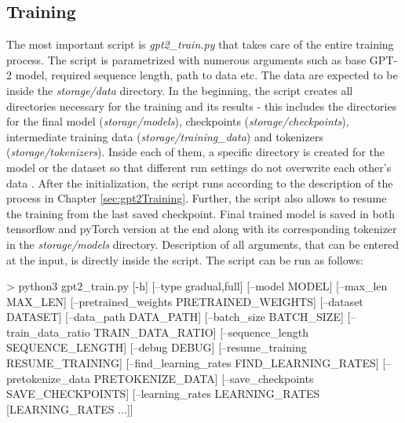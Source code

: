 \subsection*{Training}
The most important script is \textit{gpt2\_train.py} that takes care of the entire training process. The script is parametrized with numerous arguments such as base GPT-2 model, required sequence length, path to data etc. The data are expected to be inside the \textit{storage/data} directory. In the beginning, the script creates all directories necessary for the training and its results - this includes the directories for the final model (\textit{storage/models}), checkpoints (\textit{storage/checkpoints}), intermediate training data (\textit{storage/training\_data}) and tokenizers (\textit{storage/tokenizers}). Inside each of them, a specific directory is created for the model or the dataset so that different run settings do not overwrite each other's data . After the initialization, the script runs according to the description of the process in Chapter \ref{sec:gpt2Training}. Further, the script also allows to resume the training from the last saved checkpoint. Final trained model is saved in both tensorflow and pyTorch version at the end along with its corresponding tokenizer in the \textit{storage/models} directory. Description of all arguments, that can be entered at the input, is directly inside the script. The script can be run as follows:
\newpage
\begin{code}
> python3 gpt2_train.py [-h] [--type {gradual,full}] 
                [--model MODEL] [--max_len MAX_LEN] 
                [--pretrained_weights PRETRAINED_WEIGHTS] 
                [--dataset DATASET] [--data_path DATA_PATH] 
                [--batch_size BATCH_SIZE]
                [--train_data_ratio TRAIN_DATA_RATIO] 
                [--sequence_length SEQUENCE_LENGTH] [--debug DEBUG] 
                [--resume_training RESUME_TRAINING] 
                [--find_learning_rates FIND_LEARNING_RATES]
                [--pretokenize_data PRETOKENIZE_DATA] 
                [--save_checkpoints SAVE_CHECKPOINTS] 
                [--learning_rates LEARNING_RATES [LEARNING_RATES ...]]
\end{code}

